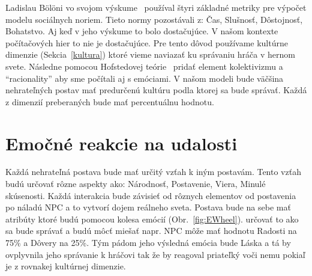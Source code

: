 \documentclass[10pt,twoside,slovak,a4paper]{article}
\begin{document}
Ladislau B\"{o}l\"{o}ni vo svojom výskume~\cite{computationalmodel2018} používal štyri
základné metriky pre výpočet modelu sociálnych noriem. Tieto normy pozostávali z: Čas, 
Slušnosť, Dôstojnosť, Bohatstvo. Aj keď v jeho výskume to bolo dostačujúce. V našom kontexte 
počítačových hier to nie je dostačujúce. Pre tento dôvod používame kultúrne dimenzie 
(Sekcia~\ref{kultura}) ktoré vieme naviazať ku správaniu hráča v hernom svete. Následne 
pomocou Hofstedovej teórie~\cite{hofstede2010cultures} pridať element kolektivizmu a ``racionality'' 
aby sme počítali aj s emóciami. V našom modeli bude väčšina nehrateľných postav mať predurčenú 
kultúru podla ktorej sa bude správať. Každá z dimenzií preberaných bude mať percentuálnu hodnotu.

\section{Emočné reakcie na udalosti}\label{reakcie}

Každá nehrateľná postava bude mať určitý vzťah k iným postavám. Tento vzťah budú
určovať rôzne aspekty ako: Národnosť, Postavenie, Viera, Minulé skúsenosti.
Každá interakcia bude závisieť od rôznych elementov od postavenia po náladú NPC
a to vytvorí dojem reálneho sveta. Postava bude na sebe mať atribúty ktoré budú pomocou kolesa emócií
(Obr.~\ref{fig:EWheel}). určovať to ako sa bude správať a budú môcť miešať napr. NPC môže mať hodnotu
Radosti na 75\% a Dôvery na 25\%. Tým pádom jeho výsledná emócia bude Láska a tá by ovplyvnila jeho
správanie k hráčovi tak že by reagoval priateľký voči nemu pokiaľ je z rovnakej kultúrnej dimenzie.
\end{document}
